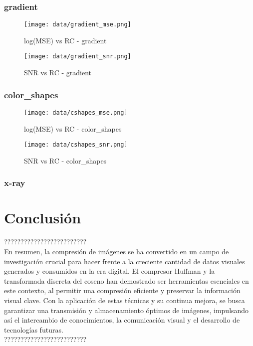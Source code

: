 \documentclass[12pt,a4paper]{article}
\begin{document}
\subsubsection{gradient}
\begin{figure}[H]
    \centering
    \texttt{[image: data/gradient\_mse.png]}
    \caption{log(MSE) vs RC - gradient}
    
\end{figure}

\begin{figure}[H]
    \centering
    \texttt{[image: data/gradient\_snr.png]}
    \caption{SNR vs RC - gradient}
    
\end{figure}

\subsubsection{color\_shapes}
\begin{figure}[H]
    \centering
    \texttt{[image: data/cshapes\_mse.png]}
    \caption{log(MSE) vs RC - color\_shapes}
    
\end{figure}

\begin{figure}[H]
    \centering
    \texttt{[image: data/cshapes\_snr.png]}
    \caption{SNR vs RC - color\_shapes}
    
\end{figure}

\subsubsection{x-ray}


\newpage
\section{Conclusión}

?????????????????????????\\
En resumen, la compresión de imágenes se ha convertido en un campo de investigación crucial para hacer frente a la creciente cantidad de datos visuales generados y consumidos en la era digital. El compresor Huffman y la transformada discreta del coseno han demostrado ser herramientas esenciales en este contexto, al permitir una compresión eficiente y preservar la información visual clave. Con la aplicación de estas técnicas y su continua mejora, se busca garantizar una transmisión y almacenamiento óptimos de imágenes, impulsando así el intercambio de conocimientos, la comunicación visual y el desarrollo de tecnologías futuras.\\
?????????????????????????
\end{document}
